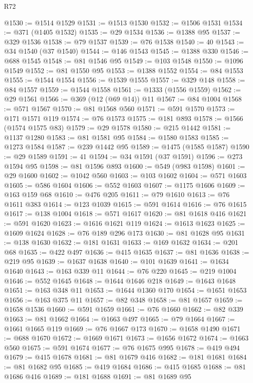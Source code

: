 \begin{lexlean}{R72}
\begin{coremodule}
@1530 := @1514 @1529
@1531 := @1513 @1530
@1532 := @1506 @1531
@1534 := @371 (@1405 @1532)
@1535 := @29 @1534
@1536 := @1388 @95
@1537 := @329 @1536
@1538 := @79 @1537
@1539 := @76 @1538
@1540 := 40
@1543 := @34 @1540 (@37 @1540)
@1544 := @146 @1543
@1545 := @1388 @330
@1546 := @688 @1545
@1548 := @81 @1546 @95
@1549 := @103 @1548
@1550 := @1096 @1549
@1552 := @81 @1550 @95
@1553 := @1388 @1552
@1554 := @84 @1553
@1555 := @1544 @1554
@1556 := @1539 @1555
@1557 := @329 @148
@1558 := @84 @1557
@1559 := @1544 @1558
@1561 := @1333 (@1556 @1559)
@1562 := @29 @1561
@1566 := @369 (@12 (@69 @14)) @11
@1567 := @84 @1004
@1568 := @571 @1567
@1570 := @81 @1568 @560
@1571 := @591 @1570
@1573 := @171 @1571 @119
@1574 := @76 @1573
@1575 := @181 @893
@1578 := @1566 (@1574 @1575 @83)
@1579 := @29 @1578
@1580 := @215 @1442
@1581 := @1137 @1280
@1583 := @81 @1581 @95
@1584 := @1580 @1583
@1585 := @1273 @1584
@1587 := @239 @1442 @95
@1589 := @1475 (@1585 @1587)
@1590 := @29 @1589
@1591 := 41
@1594 := @34 @1591 (@37 @1591)
@1596 := @273 @1594 @95
@1598 := @81 @1596 @893
@1600 := @549 (@983 @1598)
@1601 := @29 @1600
@1602 := @1042 @560
@1603 := @103 @1602
@1604 := @571 @1603
@1605 := @586 @1604
@1606 := @552 @1603
@1607 := @1175 @1606
@1609 := @163 @159 @68
@1610 := @476 @205
@1611 := @79 @1610
@1613 := @76 @1611 @383
@1614 := @123 @1039
@1615 := @591 @1614
@1616 := @76 @1615
@1617 := @138 @1004
@1618 := @571 @1617
@1620 := @81 @1618 @416
@1621 := @591 @1620
@1623 := @1616 @1621 @119
@1624 := @1613 @1623
@1625 := @1609 @1624
@1628 := @76 @189 @296 @173
@1630 := @81 @1628 @95
@1631 := @138 @1630
@1632 := @181 @1631
@1633 := @169 @1632
@1634 := @201 @68
@1635 := @422 @497
@1636 := @415 @1635
@1637 := @81 @1636
@1638 := @219 @95
@1639 := @1637 @1638
@1640 := @101 @1639
@1641 := @1634 @1640
@1643 := @163 @339 @11
@1644 := @76 @220
@1645 := @219 @1004
@1646 := @552 @1645
@1648 := @1644 @1646 @218
@1649 := @1643 @1648
@1651 := @163 @348 @11
@1653 := @1644 @1360 @170
@1654 := @1651 @1653
@1656 := @163 @375 @11
@1657 := @82 @348
@1658 := @81 @1657
@1659 := @1658 @1536
@1660 := @591 @1659
@1661 := @76 @1660
@1662 := @82 @339
@1663 := @81 @1662
@1664 := @1663 @497
@1665 := @79 @1664
@1667 := @1661 @1665 @119
@1669 := @76 @1667 @173
@1670 := @1658 @1490
@1671 := @688 @1670
@1672 := @1669 @1671
@1673 := @1656 @1672
@1674 := @1663 @560
@1675 := @591 @1674
@1677 := @76 @1675 @995
@1678 := @419 @494
@1679 := @415 @1678
@1681 := @81 @1679 @416
@1682 := @181 @1681
@1684 := @81 @1682 @95
@1685 := @419 @1684
@1686 := @415 @1685
@1688 := @81 @1686 @416
@1689 := @181 @1688
@1691 := @81 @1689 @95

\end{coremodule}
\end{lexlean}
